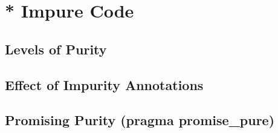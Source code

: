 \section{* Impure Code}
\subsection{Levels of Purity}
\subsection{Effect of Impurity Annotations}
\subsection{Promising Purity (pragma promise\_pure)}



